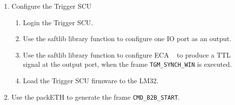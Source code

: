 \begin{enumerate}
\begin{enumerate}
    \end{enumerate}
  \item Configure the Trigger SCU
    \begin{enumerate}
    \item Login the Trigger SCU.
	\item Use the saftlib library function to configure one IO port as an output. 
	\item Use the saftlib library function to configure ECA ~\cite{terpstra_timing_2013} to produce a TTL signal at the output port, when the frame \verb|TGM_SYNCH_WIN| is executed. 
	\item Load the Trigger SCU firmware to the LM32.
    \end{enumerate}
	\item Use the packETH to generate the frame \verb|CMD_B2B_START|.
\end{enumerate}



